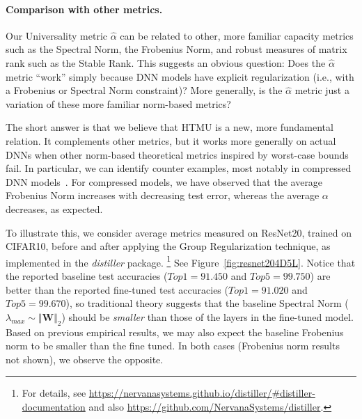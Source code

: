 \paragraph{Comparison with other metrics.}
Our Universality metric $\hat{\alpha}$ can be related to other, more familiar capacity metrics such as the Spectral Norm, the Frobenius Norm, and robust measures of matrix rank such as the Stable Rank.
This suggests an obvious question: 
Does the $\hat{\alpha}$ metric ``work'' simply because DNN models have explicit regularization (i.e., with a Frobenius or Spectral Norm constraint)?
More generally, is the $\hat{\alpha}$ metric just a variation of these more familiar norm-based metrics?  

The short answer is that we believe that HTMU is a new, more fundamental relation. 
It complements other metrics, but it works more generally on actual DNNs when other norm-based theoretical metrics inspired by worst-case bounds fail. 
In particular, we can identify counter examples, most notably in compressed DNN models~\cite{CWZZ17_TR}.
For compressed models, we have observed that the average Frobenius Norm increases with decreasing test error, whereas the average $\alpha$ decreases, as expected.  


To illustrate this, we consider average metrics measured on ResNet20, trained on CIFAR10, before and after applying the Group Regularization technique, 
as implemented in the \emph{distiller} package.%
\footnote{For details, see \url{https://nervanasystems.github.io/distiller/\#distiller-documentation} and also \url{https://github.com/NervanaSystems/distiller}.}
See Figure~\ref{fig:resnet204D5L}.
Notice that the reported baseline test accuracies ($Top1=91.450$ and $Top5=99.750$) 
are better than the reported fine-tuned test accuracies ($Top1=91.020$ and $Top5=99.670$), so traditional theory suggests that the baseline Spectral Norm
($\lambda_{max}\sim\Vert\mathbf{W}\Vert_{2}$) should be \emph{smaller} than those of the layers in the fine-tuned model.
Based on previous empirical results, we may also expect the baseline Frobenius norm to be smaller than the fine tuned. 
In both cases (Frobenius norm results not shown), we observe the opposite.

